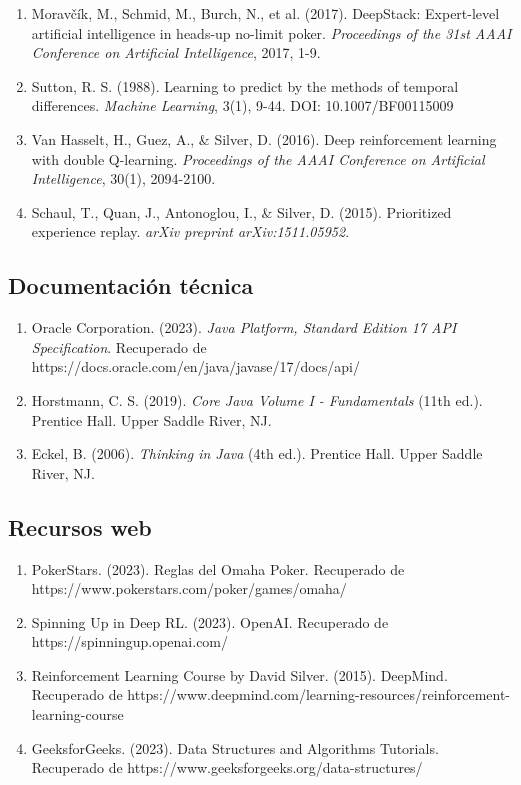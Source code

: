 \documentclass[12pt,a4paper]{article}
\begin{document}
\begin{enumerate}
    \item Moravčík, M., Schmid, M., Burch, N., et al. (2017). DeepStack: Expert-level artificial intelligence in heads-up no-limit poker. \textit{Proceedings of the 31st AAAI Conference on Artificial Intelligence}, 2017, 1-9.
    
    \item Sutton, R. S. (1988). Learning to predict by the methods of temporal differences. \textit{Machine Learning}, 3(1), 9-44. DOI: 10.1007/BF00115009
    
    \item Van Hasselt, H., Guez, A., \& Silver, D. (2016). Deep reinforcement learning with double Q-learning. \textit{Proceedings of the AAAI Conference on Artificial Intelligence}, 30(1), 2094-2100.
    
    \item Schaul, T., Quan, J., Antonoglou, I., \& Silver, D. (2015). Prioritized experience replay. \textit{arXiv preprint arXiv:1511.05952}.
\end{enumerate}

\subsection{Documentación técnica}

\begin{enumerate}
    \item Oracle Corporation. (2023). \textit{Java Platform, Standard Edition 17 API Specification}. Recuperado de https://docs.oracle.com/en/java/javase/17/docs/api/
    
    \item Horstmann, C. S. (2019). \textit{Core Java Volume I - Fundamentals} (11th ed.). Prentice Hall. Upper Saddle River, NJ.
    
    \item Eckel, B. (2006). \textit{Thinking in Java} (4th ed.). Prentice Hall. Upper Saddle River, NJ.
\end{enumerate}

\subsection{Recursos web}

\begin{enumerate}
    \item PokerStars. (2023). Reglas del Omaha Poker. Recuperado de https://www.pokerstars.com/poker/games/omaha/

    \item Spinning Up in Deep RL. (2023). OpenAI. Recuperado de https://spinningup.openai.com/
    
    \item Reinforcement Learning Course by David Silver. (2015). DeepMind. Recuperado de https://www.deepmind.com/learning-resources/reinforcement-learning-course
    
    \item GeeksforGeeks. (2023). Data Structures and Algorithms Tutorials. Recuperado de https://www.geeksforgeeks.org/data-structures/
\end{enumerate}
\end{document}

